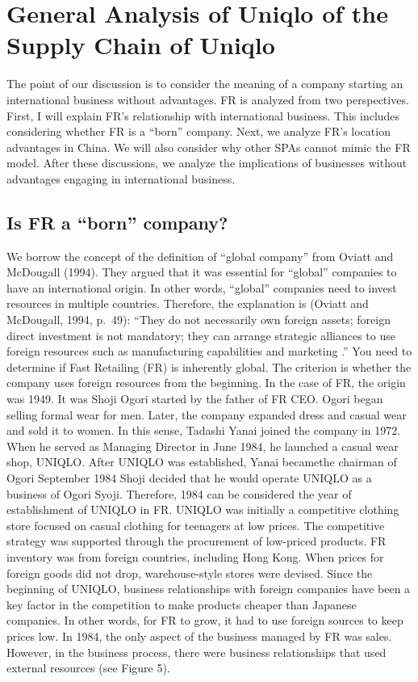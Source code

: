 \documentclass[]{article}
\begin{document}
\hypertarget{general-analysis-of-uniqlo-of-the-supply-chain-of-uniqlo}{%
\section{General Analysis of Uniqlo of the Supply Chain of
Uniqlo}\label{general-analysis-of-uniqlo-of-the-supply-chain-of-uniqlo}}

The point of our discussion is to consider the meaning of a company
starting an international business without advantages. FR is analyzed
from two perspectives. First, I will explain FR's relationship with
international business. This includes considering whether FR is a
``born'' company. Next, we analyze FR's location advantages in China. We
will also consider why other SPAs cannot mimic the FR model. After these
discussions, we analyze the implications of businesses without
advantages engaging in international business.

\hypertarget{is-fr-a-born-company}{%
\subsection{Is FR a ``born'' company?}\label{is-fr-a-born-company}}

We borrow the concept of the definition of ``global company'' from
Oviatt and McDougall (1994). They argued that it was essential for
``global'' companies to have an international origin. In other words,
``global'' companies need to invest resources in multiple countries.
Therefore, the explanation is (Oviatt and McDougall, 1994, p.~49):
``They do not necessarily own foreign assets; foreign direct investment
is not mandatory; they can arrange strategic alliances to use foreign
resources such as manufacturing capabilities and marketing .'' You need
to determine if Fast Retailing (FR) is inherently global. The criterion
is whether the company uses foreign resources from the beginning. In the
case of FR, the origin was 1949. It was Shoji Ogori started by the
father of FR CEO. Ogori began selling formal wear for men. Later, the
company expanded dress and casual wear and sold it to women. In this
sense, Tadashi Yanai joined the company in 1972. When he served as
Managing Director in June 1984, he launched a casual wear shop, UNIQLO.
After UNIQLO was established, Yanai becamethe chairman of Ogori
September 1984 Shoji decided that he would operate UNIQLO as a business
of Ogori Syoji. Therefore, 1984 can be considered the year of
establishment of UNIQLO in FR. UNIQLO was initially a competitive
clothing store focused on casual clothing for teenagers at low prices.
The competitive strategy was supported through the procurement of
low-priced products. FR inventory was from foreign countries, including
Hong Kong. When prices for foreign goods did not drop, warehouse-style
stores were devised. Since the beginning of UNIQLO, business
relationships with foreign companies have been a key factor in the
competition to make products cheaper than Japanese companies. In other
words, for FR to grow, it had to use foreign sources to keep prices low.
In 1984, the only aspect of the business managed by FR was sales.
However, in the business process, there were business relationships that
used external resources (see Figure 5).
\end{document}
